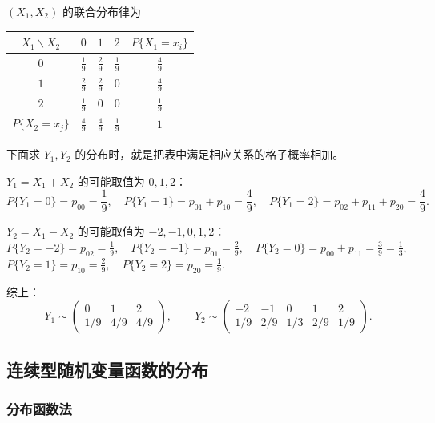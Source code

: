 \documentclass[lang=cn,11pt]{elegantbook}
\begin{document}
\begin{solution}
 $(X_1, X_2)$ 的联合分布律为
\begin{center}
\begin{tabular}{c|ccc|c}
\toprule
$X_1 \backslash X_2$ & $0$ & $1$ & $2$ & $P\{X_1=x_i\}$ \\
\midrule
$0$ & $\frac19$ & $\frac29$ & $\frac19$ & $\frac49$ \\
$1$ & $\frac29$ & $\frac29$ & $0$ & $\frac49$ \\
$2$ & $\frac19$ & $0$ & $0$ & $\frac19$ \\
\midrule
$P\{X_2=x_j\}$ & $\frac49$ & $\frac49$ & $\frac19$ & $1$ \\
\bottomrule
\end{tabular}
\end{center}
下面求 $Y_1,Y_2$ 的分布时，就是把表中满足相应关系的格子概率相加。

$Y_1 = X_1 + X_2$ 的可能取值为 $0, 1, 2$：
\[
P\{Y_1 = 0\} = p_{00} = \frac{1}{9}, \quad P\{Y_1 = 1\} = p_{01} + p_{10} = \frac{4}{9}, \quad P\{Y_1 = 2\} = p_{02} + p_{11} + p_{20} = \frac{4}{9}.
\]

$Y_2 = X_1 - X_2$ 的可能取值为 $-2, -1, 0, 1, 2$：
\(
P\{Y_2 = -2\} = p_{02} = \frac{1}{9}, \quad P\{Y_2 = -1\} = p_{01} = \frac{2}{9}, \quad P\{Y_2 = 0\} = p_{00} + p_{11} = \frac{3}{9} = \frac{1}{3},
\)
\(
P\{Y_2 = 1\} = p_{10} = \frac{2}{9}, \quad P\{Y_2 = 2\} = p_{20} = \frac{1}{9}.
\)

综上：
\[
Y_1 \sim \begin{pmatrix} 0 & 1 & 2 \\ 1/9 & 4/9 & 4/9 \end{pmatrix}, \qquad Y_2 \sim \begin{pmatrix} -2 & -1 & 0 & 1 & 2 \\ 1/9 & 2/9 & 1/3 & 2/9 & 1/9 \end{pmatrix}.
\]
\end{solution}

\subsection{连续型随机变量函数的分布}

\subsubsection{分布函数法}
\end{document}
